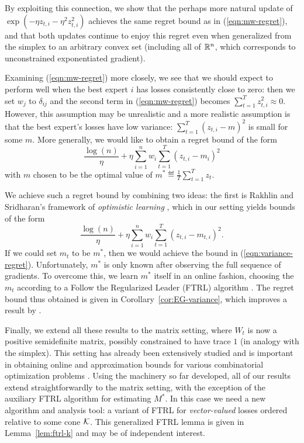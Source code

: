 \documentclass[paper_icml.tex]{subfiles}
\begin{document}
By exploiting this connection, we show that the perhaps more natural update 
of $\exp(-\eta z_{t,i} - \eta^2 z_{t,i}^2)$ achieves the same regret bound 
as in (\ref{eqn:mw-regret}), and that both updates continue to enjoy this 
regret even when generalized from the simplex to an arbitrary convex set 
(including all of $\mathbb{R}^n$, which corresponds to unconstrained exponentiated 
gradient). 

Examining (\ref{eqn:mw-regret}) more closely, we see that we should expect 
to perform well when the best expert $i$ has losses consistently close to zero: 
then we set $w_j$ to $\delta_{ij}$ and the second term in (\ref{eqn:mw-regret}) 
becomes $\sum_{t=1}^T z_{t,i}^2 \approx 0$. However, this assumption may be 
unrealistic and a more realistic assumption is that the best expert's losses 
have low variance: $\sum_{t=1}^T (z_{t,i} - m)^2$ is small for some $m$. More 
generally, we would like to obtain a regret bound of the form
\begin{equation}
\label{eqn:variance-regret}
\frac{\log(n)}{\eta} + \eta \sum_{i=1}^n w_i \sum_{t=1}^T (z_{t,i}-m_i)^2
\end{equation}
with $m$ chosen to be the optimal value of 
$m^* \eqdef \frac{1}{T} \sum_{t=1}^T z_t$.

We achieve such a regret bound by combining two ideas: the first is 
Rakhlin and Sridharan's framework of \emph{optimistic learning} 
\cite{rakhlin2012}, which in our setting yields bounds of the form 
\begin{equation}
\label{eqn:optimistic-regret}
\frac{\log(n)}{\eta} + \eta \sum_{i=1}^n w_i \sum_{t=1}^T (z_{t,i} - m_{t,i})^2.
\end{equation}
If we could set $m_t$ to be $m^*$, then we would achieve the bound in 
(\ref{eqn:variance-regret}). Unfortunately, $m^*$ is only known after observing 
the full sequence of gradients. To overcome this, we learn $m^*$ itself in an 
online fashion, choosing the $m_t$ according to a Follow the Regularized Leader 
(FTRL) algorithm \cite{hazan2011ftrl}. The regret bound thus obtained is given in 
Corollary~\ref{cor:EG-variance}, which improves a result by 
\cite{hazan2010variation}.

Finally, we extend all these results to the matrix setting, where $W_t$ is now 
a positive semidefinite matrix, possibly constrained to have trace $1$ 
(in analogy with the simplex). This setting has already been extensively studied 
\cite{tsuda2005matrix, arora2007combinatorial} and is important in 
obtaining online and approximation bounds for various combinatorial optimization 
problems \cite{arora2007combinatorial, hazan2012near}. Using the machinery so 
far developed, all of our results extend straightforwardly to the matrix setting, 
with the exception of the auxiliary FTRL algorithm for estimating $M^*$. In this 
case we need a new algorithm and analysis tool: a variant of FTRL for 
\emph{vector-valued} losses ordered relative to some cone $\mathcal{K}$. This generalized 
FTRL lemma is given in Lemma~\ref{lem:ftrl-k} and may be of independent interest.
\end{document}
